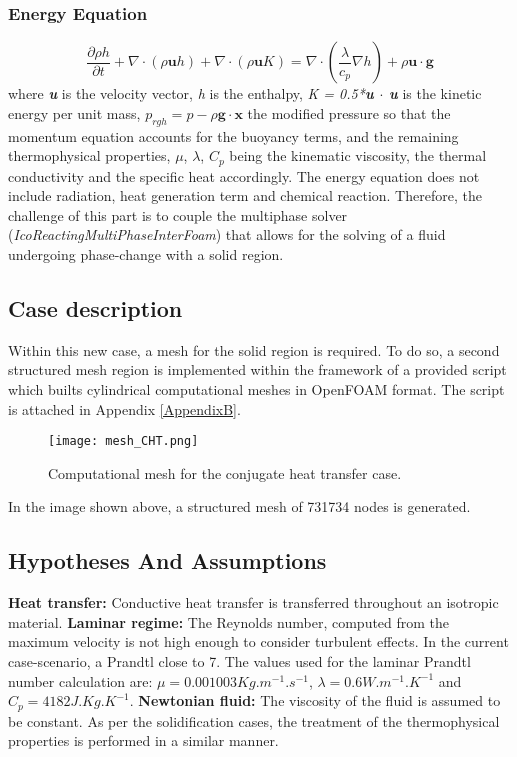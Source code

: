 \subsubsection*{Energy Equation}
\begin{equation}
	\frac{\partial \rho h}{\partial t}+\nabla \cdot(\rho \boldsymbol{u} h)+\nabla \cdot(\rho \boldsymbol{u} K)=\nabla \cdot\left(\frac{\lambda}{c_{p}} \nabla h\right)+\rho \boldsymbol{u} \cdot \boldsymbol{g}
	\label{4.3}
\end{equation}
where \textit{\textbf{u}} is the velocity vector, \textit{h} is the enthalpy, \textit{K = 0.5*\textbf{u $\cdot$ u}} is the kinetic energy per unit mass, \textit{$p_{rgh}=p-\rho\textbf{g}\cdot\textbf{x}$} the modified pressure so that the momentum equation accounts for the buoyancy terms, and the remaining thermophysical properties, $\mu$, $\lambda$, $C_p$ being the kinematic viscosity, the thermal conductivity and the specific heat accordingly. The energy equation does not include radiation, heat generation term and chemical reaction.
\newline
Therefore, the challenge of this part is to couple the multiphase solver (\textit{IcoReactingMultiPhaseInterFoam}) that allows for the solving of a fluid undergoing phase-change with a solid region.  
\subsection{Case description}
Within this new case, a mesh for the solid region is required. To do so, a second structured mesh region is implemented within the framework of a provided script which builts cylindrical computational meshes in OpenFOAM format. The script is attached in Appendix \ref{AppendixB}.
\begin{figure}[h!]
	\centering
	\texttt{[image: mesh\_CHT.png]}	
	\label{4.1fig}
	\caption{Computational mesh for the conjugate heat transfer case.}
\end{figure} 
In the image shown above, a structured mesh of 731734 nodes is generated.
\subsection{Hypotheses And Assumptions}
\textbf{Heat transfer:} Conductive heat transfer is transferred throughout an isotropic material. 
\newline
\textbf{Laminar regime:} The Reynolds number, computed from the maximum velocity is not high enough to consider turbulent effects. 
\newline
In the current case-scenario, a Prandtl close to 7. The values used for the laminar Prandtl number calculation are: $\mu = 0.001003 Kg.m^{-1}.s^{-1}$, $\lambda = 0.6 W.m^{-1}.K^{-1}$ and $C_{p}=4182 J.Kg.K^{-1}$.
\newline
\textbf{Newtonian fluid:} The viscosity of the fluid is assumed to be constant.
As per the solidification cases, the treatment of the thermophysical properties is performed in a similar manner.
